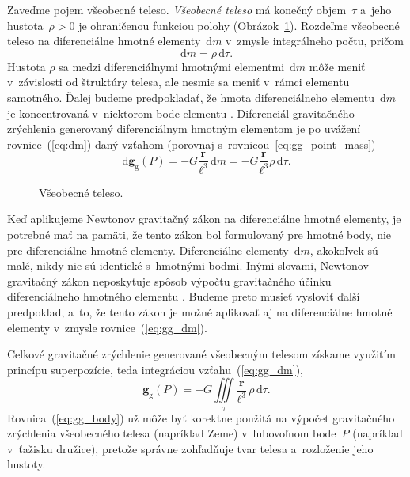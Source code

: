 \documentclass[a4paper, 12pt]{book}
\newcommand{\diff}{\mathrm d}
\newcommand{\gidx}{\mathrm g}
\let\vec\mathbf
\begin{document}
Zaveďme pojem všeobecné teleso.  \emph{Všeobecné teleso} má konečný 
objem~$\tau$ a~jeho hustota~$\rho > 0$ je ohraničenou funkciou polohy 
(Obrázok~\ref{fig:gravitating_body}).  Rozdeľme všeobecné teleso na 
diferenciálne hmotné elementy~$\diff m$ v~zmysle integrálneho počtu, pričom
%
\begin{equation}
\label{eq:dm}
\diff m = \rho \, \diff \tau{.}
\end{equation}
%
Hustota $\rho$ sa medzi diferenciálnymi hmotnými elementmi~$\diff m$ môže meniť 
v~závislosti od štruktúry telesa, ale nesmie sa meniť v~rámci elementu 
samotného.  Ďalej budeme predpokladať, že hmota diferenciálneho elementu~$\diff 
m$ je koncentrovaná v~niektorom bode elementu \parencite{Kellogg1967}.  
Diferenciál gravitačného zrýchlenia generovaný diferenciálnym hmotným elementom 
je po uvážení rovnice~(\ref{eq:dm}) daný vzťahom (porovnaj 
s~rovnicou~\ref{eq:gg_point_mass})
%
\begin{equation}
\label{eq:gg_dm}
\diff \vec g_\gidx(P) = -G \frac{\vec r}{\ell^3} \, \diff m = -G \frac{\vec 
r}{\ell^3} \rho \, \diff\tau{.}
\end{equation}

\begin{figure}
\centering

\caption{Všeobecné teleso.}
\label{fig:gravitating_body}
\end{figure}

Keď aplikujeme Newtonov gravitačný zákon na diferenciálne hmotné elementy, je 
potrebné mať na pamäti, že tento zákon bol formulovaný pre hmotné body, nie pre 
diferenciálne hmotné elementy.  Diferenciálne elementy~$\diff m$, akokoľvek sú 
malé, nikdy nie sú identické s~hmotnými bodmi.  Inými slovami, Newtonov 
gravitačný zákon neposkytuje spôsob výpočtu gravitačného účinku diferenciálneho 
hmotného elementu \parencite{Kellogg1967}.  Budeme preto musieť vysloviť ďalší 
predpoklad, a~to, že tento zákon je možné aplikovať aj na diferenciálne hmotné 
elementy v~zmysle rovnice~(\ref{eq:gg_dm}).

Celkové gravitačné zrýchlenie generované všeobecným telesom získame
využitím princípu superpozície, teda integráciou vzťahu~(\ref{eq:gg_dm}),
%
\begin{equation}
\label{eq:gg_body}
\vec g_\gidx(P) = -G \iiint\limits_{\tau} \frac{\vec r}{\ell^3} \, \rho \, 
\diff\tau{.}
\end{equation}
%
Rovnica~(\ref{eq:gg_body}) už môže byť korektne použitá na výpočet gravitačného 
zrýchlenia všeobecného telesa (napríklad Zeme) v~ľubovoľnom bode~$P$ (napríklad 
v~ťažisku družice), pretože správne zohľadňuje tvar telesa a~rozloženie jeho 
hustoty.
\end{document}
